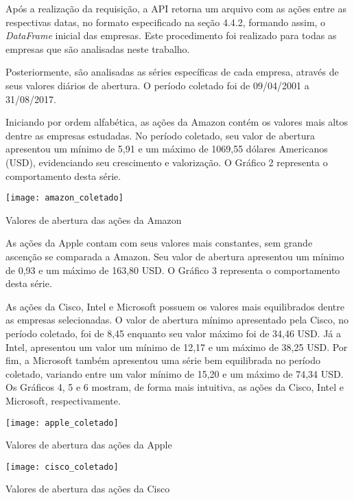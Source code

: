 Após a realização da requisição, a API retorna um arquivo com as ações entre as respectivas datas, no formato especificado na seção 4.4.2, formando assim, o \textit{DataFrame} inicial das empresas. Este procedimento foi realizado para todas as empresas que são analisadas neste trabalho.

Posteriormente, são analisadas as séries específicas de cada empresa, através de seus valores diários de abertura. O período coletado foi de 09/04/2001 a 31/08/2017.

Iniciando por ordem alfabética, as ações da Amazon contém os valores mais altos dentre as empresas estudadas. No período coletado, seu valor de abertura apresentou um mínimo de 5,91 e um máximo de 1069,55 dólares Americanos (USD), evidenciando seu crescimento e valorização. O Gráfico 2 representa o comportamento desta série.
\begin{grafico}[h]
	\centering
	\centerline{\texttt{[image: amazon\_coletado]}}
	\caption{Valores de abertura das ações da Amazon}
	\label{exec-amazon-coleta}
\end{grafico}

As ações da Apple contam com seus valores mais constantes, sem grande ascenção se comparada a Amazon. Seu valor de abertura apresentou um mínimo de 0,93 e um máximo de 163,80 USD. O Gráfico 3 representa o comportamento desta série.

As ações da Cisco, Intel e Microsoft possuem os valores mais equilibrados dentre as empresas selecionadas. O valor de abertura mínimo apresentado pela Cisco, no período coletado, foi de 8,45 enquanto seu valor máximo foi de 34,46 USD. Já a Intel, apresentou um valor um mínimo de 12,17 e um máximo de 38,25 USD. Por fim, a Microsoft também apresentou uma série bem equilibrada no período coletado, variando entre um valor mínimo de 15,20 e um máximo de 74,34 USD. Os Gráficos 4, 5 e 6 mostram, de forma mais intuitiva, as ações da Cisco, Intel e Microsoft, respectivamente. 	
\begin{grafico}[h]
	\centering
	\centerline{\texttt{[image: apple\_coletado]}}
	\caption{Valores de abertura das ações da Apple}
	\label{exec-apple-coleta}
\end{grafico}

\begin{grafico}[h]
	\centering
	\centerline{\texttt{[image: cisco\_coletado]}}
	\caption{Valores de abertura das ações da Cisco}
	\label{exec-cisco-coleta}
\end{grafico}
 
